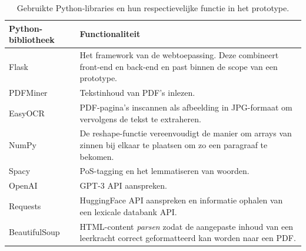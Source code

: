 \begin{center}
	\begin{table}[H]
	\begin{tabular}{ | m{4cm} | m{12cm} | } 
		\hline
		\textbf{Python-bibliotheek} & \textbf{Functionaliteit} \\
		\hline
		Flask					& Het framework van de webtoepassing. Deze combineert front-end en back-end en past binnen de scope van een prototype. \\ %
		\hline
		PDFMiner 				& Tekstinhoud van PDF's inlezen. \\ 
		\hline
		EasyOCR					& PDF-pagina's inscannen als afbeelding in JPG-formaat om vervolgens de tekst te extraheren. \\
		\hline
		NumPy 					& De reshape-functie vereenvoudigt de manier om arrays van zinnen bij elkaar te plaatsen om zo een paragraaf te bekomen. \\
		\hline		
		Spacy 					& PoS-tagging en het lemmatiseren van woorden. \\
		\hline
		OpenAI					& GPT-3 API aanspreken. \\
		\hline
		Requests				& HuggingFace API aanspreken en informatie ophalen van een lexicale databank API. \\
		\hline
		BeautifulSoup			& HTML-content \textit{parsen} zodat de aangepaste inhoud van een leerkracht correct geformatteerd kan worden naar een PDF. \\
		\hline
	\end{tabular}
	\caption{Gebruikte Python-libraries en hun respectievelijke functie in het prototype.}
	\label{table:python-libraries}
	\end{table}
\end{center}

\medspace

